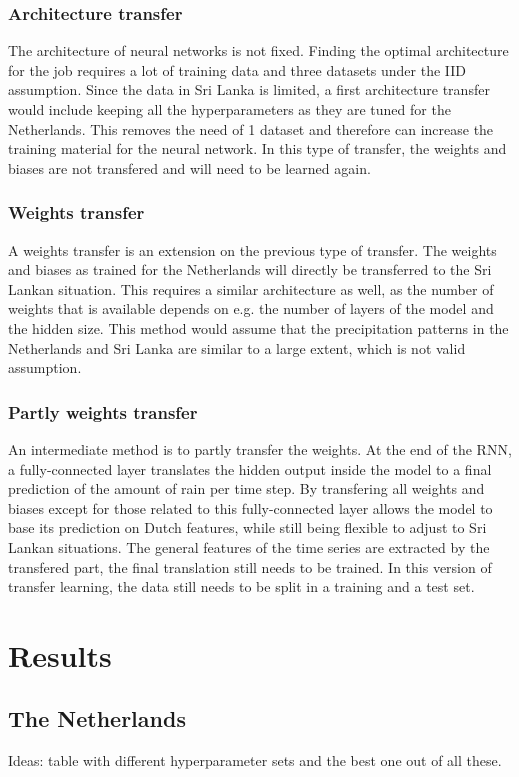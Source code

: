 \documentclass[twocolumn, 10pt, a4paper]{memoir}
\begin{document}
		\subsection{Architecture transfer}
		The architecture of neural networks is not fixed. Finding the optimal architecture for the job requires a lot of training data and three datasets under the IID assumption. Since the data in Sri Lanka is limited, a first architecture transfer would include keeping all the hyperparameters as they are tuned for the Netherlands. This removes the need of 1 dataset and therefore can increase the training material for the neural network. In this type of transfer, the weights and biases are not transfered and will need to be learned again.
		\subsection{Weights transfer}
		A weights transfer is an extension on the previous type of transfer. The weights and biases as trained for the Netherlands will directly be transferred to the Sri Lankan situation. This requires a similar architecture as well, as the number of weights that is available depends on e.g. the number of layers of the model and the hidden size. This method would assume that the precipitation patterns in the Netherlands and Sri Lanka are similar to a large extent, which is not valid assumption.
		\subsection{Partly weights transfer}
		An intermediate method is to partly transfer the weights. At the end of the RNN, a fully-connected layer translates the hidden output inside the model to a final prediction of the amount of rain per time step. By transfering all weights and biases except for those related to this fully-connected layer allows the model to base its prediction on Dutch features, while still being flexible to adjust to Sri Lankan situations. The general features of the time series are extracted by the transfered part, the final translation still needs to be trained. In this version of transfer learning, the data still needs to be split in a training and a test set. 


\chapter{Results} \label{ch: results}
\section{The Netherlands}
Ideas: table with different hyperparameter sets and the best one out of all these. 
\end{document}
